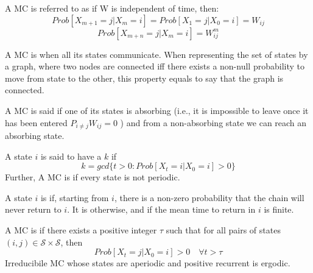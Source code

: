 \begin{definicion}[Homogeneity]
    A MC is referred to as  if W is independent of time, then:
    \begin{equation*}
        Prob[X_{m+1} = j|X_m = i] = Prob[X_1 = j|X_0 = i] = W_{ij}
    \end{equation*}
    \begin{equation*}
        Prob[X_{m+n} = j|X_m = i] = W_{ij}^m
    \end{equation*}
\end{definicion}

\begin{definicion}[Irreducibility]
    A MC is  when all its states communicate. When representing the set of states by a graph, where two nodes are connected iff there exists a non-null probability to move from state to the other, this property equals to say that the graph is connected.
\end{definicion}

\begin{definicion}[Absorbing]
    A MC is said  if one of its states is absorbing (i.e., it is impossible to leave once it has been entered $P_{i\neq j} W_{ij} = 0$ ) and from a non-absorbing state we can reach an absorbing state.
\end{definicion}

\begin{definicion}[Periodicity]
    A state $i$ is said to have a  $k$ if 
    $$k = gcd\{t > 0 : Prob[X_t = i|X_0 = i] > 0\}$$ 
    Further, A MC is  if every state is not periodic.
\end{definicion}
\begin{definicion}
    A state $i$ is  if, starting from $i$, there is a non-zero probability that the chain will never return to $i$. It is  otherwise, and  if the mean time to return in $i$ is finite.
\end{definicion}

\begin{definicion}[Ergodicity]
    A MC is  if there exists a positive integer $\tau$ such that for all pairs of states $(i, j) \in \mathcal{S} \times \mathcal{S}$, then 
    $$Prob[X_t = j|X_0 = i] > 0 \quad \forall t > \tau$$
    Irreducibile MC whose states are aperiodic and positive recurrent is ergodic.
\end{definicion}

